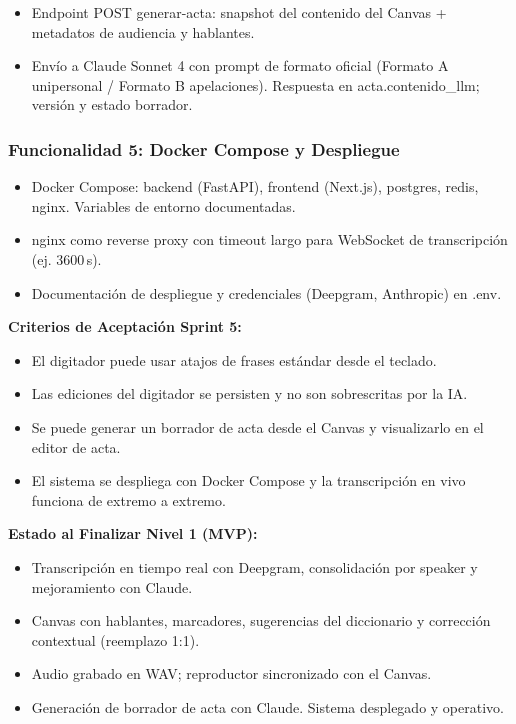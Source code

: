 \documentclass[12pt,a4paper]{report}
\begin{document}
\begin{itemize}
    \item Endpoint POST generar-acta: snapshot del contenido del Canvas + metadatos de audiencia y hablantes.
    \item Envío a Claude Sonnet 4 con prompt de formato oficial (Formato A unipersonal / Formato B apelaciones). Respuesta en acta.contenido\_llm; versión y estado borrador.
\end{itemize}

\subsubsection{Funcionalidad 5: Docker Compose y Despliegue}

\begin{itemize}
    \item Docker Compose: backend (FastAPI), frontend (Next.js), postgres, redis, nginx. Variables de entorno documentadas.
    \item nginx como reverse proxy con timeout largo para WebSocket de transcripción (ej. 3600\,s).
    \item Documentación de despliegue y credenciales (Deepgram, Anthropic) en .env.
\end{itemize}

\textbf{Criterios de Aceptación Sprint 5:}
\begin{itemize}
    \item El digitador puede usar atajos de frases estándar desde el teclado.
    \item Las ediciones del digitador se persisten y no son sobrescritas por la IA.
    \item Se puede generar un borrador de acta desde el Canvas y visualizarlo en el editor de acta.
    \item El sistema se despliega con Docker Compose y la transcripción en vivo funciona de extremo a extremo.
\end{itemize}

\textbf{Estado al Finalizar Nivel 1 (MVP):}
\begin{itemize}
    \item Transcripción en tiempo real con Deepgram, consolidación por speaker y mejoramiento con Claude.
    \item Canvas con hablantes, marcadores, sugerencias del diccionario y corrección contextual (reemplazo 1:1).
    \item Audio grabado en WAV; reproductor sincronizado con el Canvas.
    \item Generación de borrador de acta con Claude. Sistema desplegado y operativo.
\end{itemize}
\end{document}

